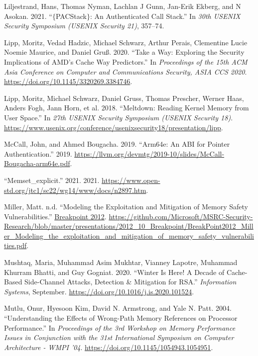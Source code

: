 \documentclass[
  a4paper,
]{report}
\newlength{\cslhangindent}
\newlength{\cslentryspacingunit} %
\newenvironment{CSLReferences}[2] %
 {%
  \setlength{\parindent}{0pt}
  \ifodd #1
  \let\oldpar\par
  \def\par{\hangindent=\cslhangindent\oldpar}
  \fi
  \setlength{\parskip}{#2\cslentryspacingunit}
 }%
 {}
\begin{document}
\begin{CSLReferences}{1}{0}
\leavevmode{}%
Liljestrand, Hans, Thomas Nyman, Lachlan J Gunn, Jan-Erik Ekberg, and N
Asokan. 2021. {``\(\{\)PACStack\(\}\): An Authenticated Call Stack.''}
In \emph{30th USENIX Security Symposium (USENIX Security 21)}, 357--74.

\leavevmode{}%
Lipp, Moritz, Vedad Hadzic, Michael Schwarz, Arthur Perais, Clementine
Lucie Noemie Maurice, and Daniel Gruß. 2020. {``Take a Way: Exploring
the Security Implications of AMD's Cache Way Predictors.''} In
\emph{Proceedings of the 15th ACM Asia Conference on Computer and
Communications Security, ASIA CCS 2020}.
\url{https://doi.org/10.1145/3320269.3384746}.

\leavevmode{}%
Lipp, Moritz, Michael Schwarz, Daniel Gruss, Thomas Prescher, Werner
Haas, Anders Fogh, Jann Horn, et al. 2018. {``Meltdown: Reading Kernel
Memory from User Space.''} In \emph{27th USENIX Security Symposium
(USENIX Security 18)}.
\url{https://www.usenix.org/conference/usenixsecurity18/presentation/lipp}.

\leavevmode{}%
McCall, John, and Ahmed Bougacha. 2019. {``Arm64e: An ABI for Pointer
Authentication.''} 2019.
\url{https://llvm.org/devmtg/2019-10/slides/McCall-Bougacha-arm64e.pdf}.

\leavevmode{}%
{``Memset\_explicit.''} 2021. 2021.
\url{https://www.open-std.org/jtc1/sc22/wg14/www/docs/n2897.htm}.

\leavevmode{}%
Miller, Matt. n.d. {``Modeling the Exploitation and Mitigation of Memory
Safety Vulnerabilities.''}
\href{https://2012.ruxconbreakpoint.com/}{Breakpoint 2012}.
\url{https://github.com/Microsoft/MSRC-Security-Research/blob/master/presentations/2012_10_Breakpoint/BreakPoint2012_Miller_Modeling_the_exploitation_and_mitigation_of_memory_safety_vulnerabilities.pdf}.

\leavevmode{}%
Mushtaq, Maria, Muhammad Asim Mukhtar, Vianney Lapotre, Muhammad Khurram
Bhatti, and Guy Gogniat. 2020. {``Winter Is Here! A Decade of
Cache-Based Side-Channel Attacks, Detection \& Mitigation for {RSA}.''}
\emph{Information Systems}, September.
\url{https://doi.org/10.1016/j.is.2020.101524}.

\leavevmode{}%
Mutlu, Onur, Hyesoon Kim, David N. Armstrong, and Yale N. Patt. 2004.
{``Understanding the Effects of Wrong-Path Memory References on
Processor Performance.''} In \emph{Proceedings of the 3rd Workshop on
Memory Performance Issues in Conjunction with the 31st International
Symposium on Computer Architecture - WMPI '04}.
\url{https://doi.org/10.1145/1054943.1054951}.


\end{CSLReferences}
\end{document}

